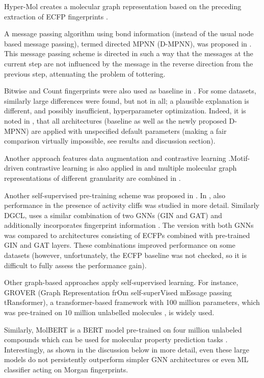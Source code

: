 Hyper-Mol creates a molecular graph representation based on the preceding extraction of ECFP fingerprints \cite{Cui.2023}.

A message passing algorithm using bond information (instead of the usual node based message passing), termed directed MPNN (D-MPNN), was proposed in \cite{Yang.2019}. This message passing scheme is directed in such a way that the messages at the current step are not influenced by the message in the reverse direction from the previous step, attenuating the problem of tottering.


Bitwise and Count fingerprints were also used as baseline in \cite{Yang.2019}. For some datasets, similarly large differences were found, but not in all; a plausible explanation is different, and possibly insufficient, hyperparameter optimization. Indeed, it is noted in \cite{Yang.2019}, that all architectures (baseline as well as the newly proposed D-MPNN) are applied with unspecified default parameters (making a fair comparison virtually impossible, see results and discussion section).

Another approach features data augmentation and contrastive learning \cite{Wang.2022} .Motif-driven contrastive learning is also applied in \cite{Zhang.2024b} and multiple molecular graph representations of different granularity are combined in \cite{Kengkanna.2024}.

Another self-supervised pre-training scheme was proposed in \cite{Wan.2025}. In \cite{Wan.2025}, also performance in the presence of activity cliffs was studied in more detail. Similarly DGCL, uses a similar combination of two GNNs (GIN and GAT) and additionally incorporates fingerprint information \cite{Jiang.2024}. The version with both GNNs was compared to architectures consisting of ECFPs combined with pre-trained GIN and GAT layers. These combinations improved performance on some datasets (however, unfortunately, the ECFP baseline was not checked, so it is difficult to fully assess the performance gain).

Other graph-based approaches apply self-supervised learning. For instance, GROVER (Graph Representation frOm self-superVised mEssage passing tRansformer), a transformer-based framework with 100 million parameters, which was pre-trained on 10 million unlabelled molecules \cite{Rong.2020}, is widely used.

Similarly, MolBERT is a BERT model pre-trained on four million unlabeled compounds which can be used for  molecular property prediction tasks \cite{Li.2021}. Interestingly, as shown in the discussion below in more detail, even these large models do not persistently outperform simpler GNN architectures or even ML classifier acting on Morgan fingerprints.

